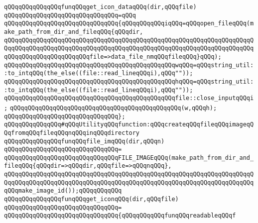 \newline
\newline
\verb|qQQqqQQqqQQqqQQqfunqQQqget_icon_dataqQQq(dir,qQQqfile)|\newline
\verb|qQQqqQQqqQQqqQQqqQQqqQQqqQQqqQQq=qQQq|\newline
\verb|qQQqqQQqqQQqqQQqqQQqqQQqqQQqqQQq{qQQqqQQqqQQqiqQQq=qQQqopen_fileqQQq(make_path_from_dir_and_fileqQQq{qQQqdir,|\newline
\verb|qQQqqQQqqQQqqQQqqQQqqQQqqQQqqQQqqQQqqQQqqQQqqQQqqQQqqQQqqQQqqQQqqQQqqQQqqQQqqQQqqQQqqQQqqQQqqQQqqQQqqQQqqQQqqQQqqQQqqQQqqQQqqQQqqQQqqQQqqQQqqQQqqQQqqQQqqQQqqQQqqQQqfile=>data_file_nmqQQqfileqQQq}qQQq);|\newline
\verb|qQQqqQQqqQQqqQQqqQQqqQQqqQQqqQQqqQQqqQQqqQQqqQQqwqQQq=qQQqstring_util::to_intqQQq(the_else((file::read_lineqQQqi),qQQq""));|\newline
\verb|qQQqqQQqqQQqqQQqqQQqqQQqqQQqqQQqqQQqqQQqqQQqqQQqhqQQq=qQQqstring_util::to_intqQQq(the_else((file::read_lineqQQqi),qQQq""));|\newline
\verb|qQQqqQQqqQQqqQQqqQQqqQQqqQQqqQQqqQQqqQQqqQQqqQQqfile::close_inputqQQqi;|\newline
\newline
\verb|qQQqqQQqqQQqqQQqqQQqqQQqqQQqqQQqqQQqqQQqqQQqqQQq(w,qQQqh);|\newline
\verb|qQQqqQQqqQQqqQQqqQQqqQQqqQQqqQQq};|\newline
\newline
\verb|qQQqqQQqqQQqqQQq#qQQqUtilityqQQqfunction:qQQqcreateqQQqfileqQQqimageqQQqfromqQQqfileqQQqnqQQqinqQQqdirectory|\newline
\newline
\verb|qQQqqQQqqQQqqQQqfunqQQqfile_imqQQq(dir,qQQqn)|\newline
\verb|qQQqqQQqqQQqqQQqqQQqqQQqqQQqqQQq=|\newline
\verb|qQQqqQQqqQQqqQQqqQQqqQQqqQQqqQQqFILE_IMAGEqQQq(make_path_from_dir_and_fileqQQq{qQQqdir=>qQQqdir,qQQqfile=>qQQqnqQQq},|\newline
\verb|qQQqqQQqqQQqqQQqqQQqqQQqqQQqqQQqqQQqqQQqqQQqqQQqqQQqqQQqqQQqqQQqqQQqqQQqqQQqqQQqqQQqqQQqqQQqqQQqqQQqqQQqqQQqqQQqqQQqqQQqqQQqqQQqqQQqqQQqqQQqqQQqmake_image_id());qQQqqQQqqQQq|\newline
\newline
\verb|qQQqqQQqqQQqqQQqfunqQQqget_iconqQQq(dir,qQQqfile)|\newline
\verb|qQQqqQQqqQQqqQQqqQQqqQQqqQQqqQQq=|\newline
\verb|qQQqqQQqqQQqqQQqqQQqqQQqqQQqqQQq{qQQqqQQqqQQqfunqQQqreadableqQQqf|\newline
